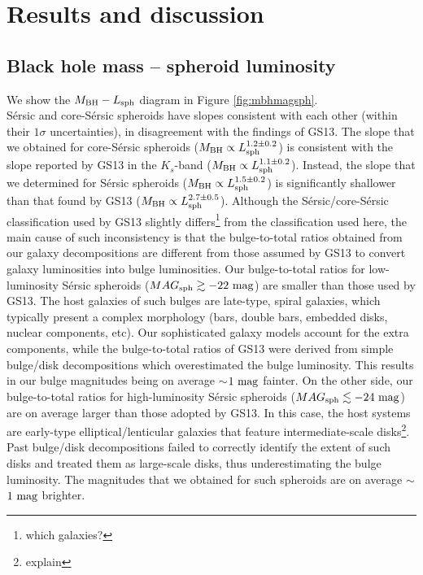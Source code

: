 \documentclass[preprint2]{emulateapj}
\begin{document}
\section{Results and discussion}
\label{sec:res}

\subsection{Black hole mass -- spheroid luminosity}
We show the $M_{\rm BH} - L_{\rm sph}$ diagram in Figure \ref{fig:mbhmagsph}. \\
S\'ersic and core-S\'ersic spheroids have slopes consistent with each other (within their $1\sigma$ uncertainties), 
in disagreement with the findings of GS13. 
The slope that we obtained for core-S\'ersic spheroids ($M_{\rm BH} \propto L_{\rm sph}^{1.2 \pm 0.2}$) 
is consistent with the slope reported by GS13 in the $K_s$-band ($M_{\rm BH} \propto L_{\rm sph}^{1.1 \pm 0.2}$). 
Instead, the slope that we determined for S\'ersic spheroids ($M_{\rm BH} \propto L_{\rm sph}^{1.5 \pm 0.2}$) 
is significantly shallower than that found by GS13 ($M_{\rm BH} \propto L_{\rm sph}^{2.7 \pm 0.5}$). 
Although the S\'ersic/core-S\'ersic classification used by GS13 slightly differs\footnote{which galaxies?} from the classification used here, 
the main cause of such inconsistency is that the bulge-to-total ratios obtained from our galaxy decompositions 
are different from those assumed by GS13 to convert galaxy luminosities into bulge luminosities.
Our bulge-to-total ratios for low-luminosity S\'ersic spheroids ($MAG_{\rm sph} \gtrsim -22 \rm~mag$) 
are smaller than those used by GS13. 
The host galaxies of such bulges are late-type, spiral galaxies, 
which typically present a complex morphology (bars, double bars, embedded disks, nuclear components, etc).
Our sophisticated galaxy models account for the extra components, 
while the bulge-to-total ratios of GS13 were derived from simple bulge/disk decompositions 
which overestimated the bulge luminosity.
This results in our bulge magnitudes being on average $\sim$$1\rm~mag$ fainter.
On the other side, our bulge-to-total ratios for high-luminosity S\'ersic spheroids ($MAG_{\rm sph} \lesssim -24 \rm~mag$) 
are on average larger than those adopted by GS13.
In this case, the host systems are early-type elliptical/lenticular galaxies that feature intermediate-scale disks\footnote{explain}.
Past bulge/disk decompositions failed to correctly identify the extent of such disks and treated them as large-scale disks, 
thus underestimating the bulge luminosity.
The magnitudes that we obtained for such spheroids are on average $\sim$$1\rm~mag$ brighter. \\
\end{document}
